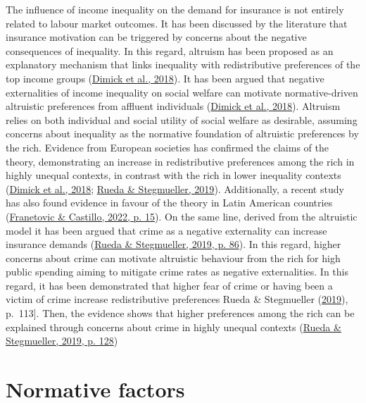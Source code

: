 \documentclass[
  12pt,
]{book}
\begin{document}
The influence of income inequality on the demand for insurance is not entirely related to labour market outcomes. It has been discussed by the literature that insurance motivation can be triggered by concerns about the negative consequences of inequality. In this regard, altruism has been proposed as an explanatory mechanism that links inequality with redistributive preferences of the top income groups (\protect\hyperlink{ref-dimick_models_2018}{Dimick et al., 2018}). It has been argued that negative externalities of income inequality on social welfare can motivate normative-driven altruistic preferences from affluent individuals (\protect\hyperlink{ref-dimick_models_2018}{Dimick et al., 2018}). Altruism relies on both individual and social utility of social welfare as desirable, assuming concerns about inequality as the normative foundation of altruistic preferences by the rich. Evidence from European societies has confirmed the claims of the theory, demonstrating an increase in redistributive preferences among the rich in highly unequal contexts, in contrast with the rich in lower inequality contexts (\protect\hyperlink{ref-dimick_models_2018}{Dimick et al., 2018}; \protect\hyperlink{ref-rueda_who_2019}{Rueda \& Stegmueller, 2019}). Additionally, a recent study has also found evidence in favour of the theory in Latin American countries (\protect\hyperlink{ref-franetovic_preferences_2022}{Franetovic \& Castillo, 2022, p. 15}). On the same line, derived from the altruistic model it has been argued that crime as a negative externality can increase insurance demands (\protect\hyperlink{ref-rueda_who_2019}{Rueda \& Stegmueller, 2019, p. 86}). In this regard, higher concerns about crime can motivate altruistic behaviour from the rich for high public spending aiming to mitigate crime rates as negative externalities. In this regard, it has been demonstrated that higher fear of crime or having been a victim of crime increase redistributive preferences Rueda \& Stegmueller (\protect\hyperlink{ref-rueda_who_2019}{2019}), p.~113{]}. Then, the evidence shows that higher preferences among the rich can be explained through concerns about crime in highly unequal contexts (\protect\hyperlink{ref-rueda_who_2019}{Rueda \& Stegmueller, 2019, p. 128})

\hypertarget{normative-factors}{%
\chapter{Normative factors}\label{normative-factors}}
\end{document}

